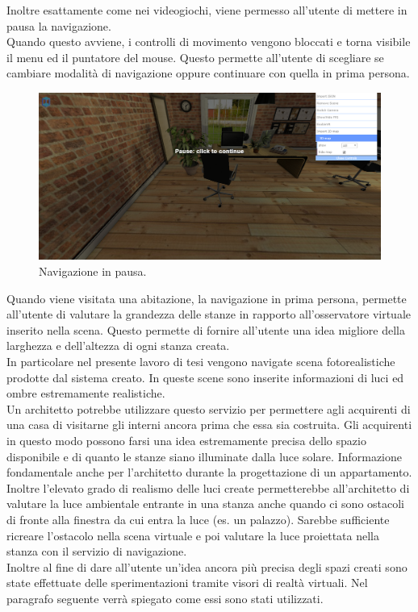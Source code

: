 Inoltre esattamente come nei videogiochi, viene permesso all’utente di mettere in pausa la navigazione. 
\\
Quando questo avviene, i controlli di movimento vengono bloccati e torna visibile il menu ed il puntatore del mouse. Questo permette all’utente di scegliare se cambiare modalità di navigazione  oppure continuare con quella in prima persona.
\begin{figure}[htb]
 \centering
 \includegraphics[width=1\linewidth]{images/chapter_navigazione_scena/navigator_pause.png}\hfill
 \caption[Navigazione in pausa.]{Navigazione in pausa.}
 \label{fig:navigazione_scena_navigator_pause}
\end{figure}
Quando viene visitata una abitazione, la navigazione in prima persona, permette all’utente di valutare la grandezza delle stanze in rapporto all’osservatore virtuale inserito nella scena. Questo permette di fornire all’utente una idea migliore della larghezza e dell’altezza di ogni stanza creata.
\\
In particolare nel presente lavoro di tesi vengono navigate scena fotorealistiche prodotte dal sistema creato. In queste scene sono inserite informazioni di luci ed ombre estremamente realistiche.
\\
Un architetto potrebbe utilizzare questo servizio per permettere agli acquirenti di una casa di visitarne gli interni ancora prima che essa sia costruita.
Gli acquirenti in questo modo possono farsi una idea estremamente precisa dello spazio disponibile e di quanto le stanze siano illuminate dalla luce solare.
Informazione fondamentale anche per l’architetto durante la progettazione di un appartamento.
\\
Inoltre l’elevato grado di realismo delle luci create permetterebbe all’architetto di valutare la luce ambientale entrante in una stanza anche quando ci sono ostacoli di fronte alla finestra da cui entra la luce (es. un palazzo). Sarebbe sufficiente ricreare l’ostacolo nella scena virtuale e poi valutare la luce proiettata nella stanza con il servizio di navigazione.
\\
Inoltre al fine di dare all’utente un’idea ancora più precisa degli spazi creati sono state effettuate delle sperimentazioni tramite visori di realtà virtuali. 
Nel paragrafo seguente verrà spiegato come essi sono stati utilizzati.

